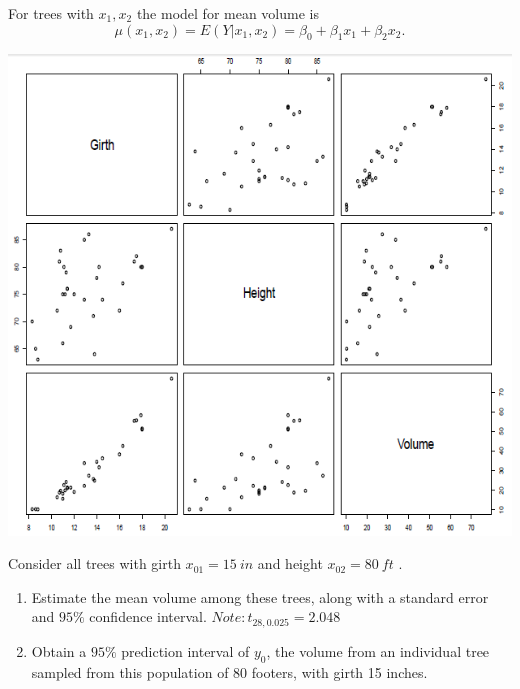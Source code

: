 \documentclass{report}
\begin{document}
For trees with $x_1,x_2$ the model for mean volume is 
$$ \mu(x_1,x_2) = E(Y|x_1,x_2) = \beta_0 + \beta_1 x_1 + \beta_2 x_2.$$ 
\begin{center}
\includegraphics[scale=0.5]{treescatter}
\end{center}


Consider all trees with girth $x_{01}=15\ in$ and height $x_{02}=80 \ ft$ .
\begin{enumerate}
\item Estimate the mean volume among these trees, along with a standard error and $95\%$ confidence interval. $Note: t_{28,0.025}=2.048$
\item Obtain a $95\%$ prediction interval of $y_0$, the volume from an 
individual tree sampled from this population of 80 footers, with girth 15 inches.
\end{enumerate}

\newpage
\end{document}
